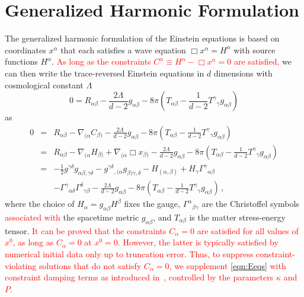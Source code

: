 \documentclass[a4paper,11pt]{article}
\numberwithin{equation}{section}
\begin{document}
\appendix
\setcounter{tocdepth}{1}
\section{Generalized Harmonic Formulation}
\label{sec:GHfor}

The generalized harmonic formulation of the Einstein equations is based on coordinates $x^\alpha$ that each satisfies a wave equation $\Box x^{\alpha}=H^\alpha$ with source functions $H^\alpha$.
\textcolor{red}{As long as the constraints $C^\alpha \equiv H^\alpha-\Box x^\alpha=0$ are satisfied,}
we can then write the trace-reversed Einstein equations in $d$ dimensions with cosmological constant $\Lambda$
\begin{equation}
0=R_{\alpha\beta} - \frac{2\Lambda}{d-2} g_{\alpha\beta} - 8\pi\left( T_{\alpha\beta} - \frac{1}{d-2} {T^\gamma}_\gamma g_{\alpha\beta} \right)
\end{equation}
as
\begin{eqnarray}
0
&=& R_{\alpha\beta} - \nabla_{(\alpha} C_{\beta)} - \frac{2\Lambda}{d-2} g_{\alpha\beta} - 8\pi\left( T_{\alpha\beta} - \frac{1}{d-2} {T^\gamma}_\gamma g_{\alpha\beta} \right) \nonumber \\
&=& R_{\alpha\beta} - \nabla_{(\alpha} H_{\beta)} + \nabla_{(\alpha} \Box{x}_{\beta)} - \frac{2\Lambda}{d-2} g_{\alpha\beta} - 8\pi\left( T_{\alpha\beta} - \frac{1}{d-2} {T^\gamma}_\gamma g_{\alpha\beta} \right) \nonumber \\
&=& -\frac{1}{2} g^{\gamma\delta} g_{\alpha\beta,\gamma\delta} - g^{\gamma\delta}{}_{,(\alpha}g_{\beta)\gamma,\delta} - H_{(\alpha,\beta)} + H_\gamma \Gamma^\gamma{}_{\alpha\beta} \nonumber \\
&&- \Gamma^\gamma{}_{\alpha\delta}\Gamma^\delta{}_{\gamma\beta} - \frac{2\Lambda}{d-2} g_{\alpha\beta} - 8\pi\left( T_{\alpha\beta} - \frac{1}{d-2} {T^\gamma}_\gamma g_{\alpha\beta}\right) \,, \label{eqn:Eeqs} 
\end{eqnarray}
where the choice of $H_\alpha = g_{\alpha\beta} H^\beta$ fixes the gauge, $\Gamma^\alpha{}_{\beta\gamma}$ are the Christoffel symbols \textcolor{red}{associated with}
the spacetime metric $g_{\alpha\beta}$, and $T_{\alpha\beta}$ is the matter stress-energy tensor. 
\textcolor{red}{It can be proved that the constraints $C_\alpha=0$ are satisfied for all values of $x^0$, as long as $C_\alpha=0$ at $x^0=0$. However, the latter is typically satisfied by numerical initial data only up to truncation error. Thus, to suppress constraint-violating solutions that do not satisfy $C_\alpha=0$, we supplement \eqref{eqn:Eeqs} with constraint damping terms as introduced in~\cite{Gundlach:2005eh}, controlled by the parameters $\kappa$ and $P$.}
\end{document}
